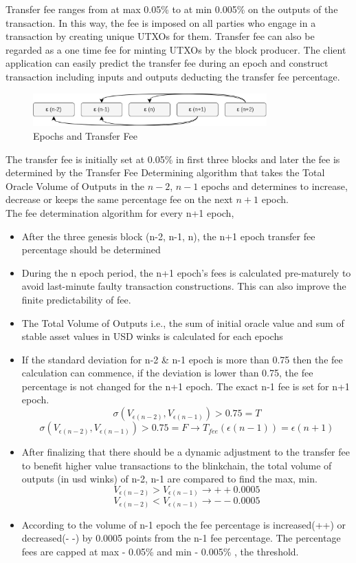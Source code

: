 \documentclass[letterpaper,11pt]{article}
\begin{document}
Transfer fee ranges from at max 0.05\% to at min 0.005\% on the outputs of the transaction. In this way, the fee is imposed on all parties who engage in a transaction by creating unique UTXOs for them. Transfer fee can also be regarded as a one time fee for minting UTXOs by the block producer. The client application can easily predict the transfer fee during an epoch and construct transaction including inputs and outputs deducting the transfer fee percentage.\\

\begin{figure}[H]
\begin{center}
\includegraphics[width=9cm]{transferepochs}
\caption{Epochs and Transfer Fee}
\end{center}
\end{figure}

The transfer fee is initially set at 0.05\% in first three blocks and later the fee is determined by the Transfer Fee Determining algorithm that takes the Total Oracle Volume of Outputs in the $n-2$, $n-1$ epochs and determines to increase, decrease or keeps the same percentage fee on the next $n+1$ epoch.\\

The fee determination algorithm for every n+1 epoch,
\begin{itemize}[wide, labelwidth=!, labelindent=0pt]
\item After the three genesis block (n-2, n-1, n), the n+1 epoch transfer fee percentage should be determined
\item During the n epoch period, the n+1 epoch's fees is calculated pre-maturely to avoid last-minute faulty transaction constructions. This can also improve the finite predictability of fee.
\item The Total Volume of Outputs i.e., the sum of initial oracle value and sum of stable asset values in USD winks is calculated for each epochs
\item If the standard deviation for n-2 \& n-1 epoch is more than 0.75 then the fee calculation can commence, if the deviation is lower than 0.75, the fee percentage is not changed for the n+1 epoch. The exact n-1 fee is set for n+1 epoch.
\[\sigma(V_{\epsilon(n-2)}, V_{\epsilon(n-1)}) > 0.75 = T \]
\[\sigma(V_{\epsilon(n-2)}, V_{\epsilon(n-1)}) > 0.75 = F \rightarrow T_{fee}(\epsilon(n-1))= \epsilon(n+1)\]
\item After finalizing that there should be a dynamic adjustment to the transfer fee to benefit higher value transactions to the blinkchain, the total volume of outputs (in usd winks) of n-2, n-1 are compared to find the max, min.
\[V_{\epsilon(n-2)} > V_{\epsilon(n-1)} \rightarrow ++0.0005 \]
\[V_{\epsilon(n-2)} < V_{\epsilon(n-1)} \rightarrow --0.0005\]
\item According to the volume of n-1 epoch the fee percentage is increased(++) or decreased(- -) by 0.0005 points from the n-1 fee percentage. The percentage fees are capped at max - 0.05\% and min - 0.005\% , the threshold.
\end{itemize}
\end{document}
